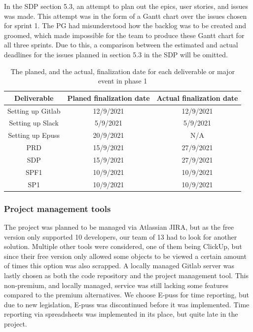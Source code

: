 \documentclass{article}
\begin{document}
In the SDP section 5.3, an attempt to plan out the epics, user stories, and issues was made. This attempt was in the form of a Gantt chart over the issues chosen for sprint 1. The PG had misunderstood how the backlog was to be created and groomed, which made impossible for the team to produce these Gantt chart for all three sprints. Due to this, a comparison between the estimated and actual deadlines for the issues planned in section 5.3 in the SDP will be omitted. 

\begin{table}[h!]
    \centering
    \begin{tabular}{|c|c|c|}
    \hline
    Deliverable & Planed finalization date & Actual finalization date \\ \hline\hline
    Setting up Gitlab & 12/9/2021 & 12/9/2021 \\ \hline
    Setting up Slack & 5/9/2021 & 5/9/2021 \\ \hline
    Setting up Epuss & 20/9/2021 & N/A \\ \hline
    PRD & 15/9/2021 & 27/9/2021 \\ \hline
    SDP & 15/9/2021 & 27/9/2021 \\ \hline
    SPF1 & 10/9/2021 & 10/9/2021 \\ \hline
    SP1 & 10/9/2021 & 10/9/2021 \\ \hline    
    \end{tabular}
    \caption{The planed, and the actual, finalization date for each deliverable or major event in phase 1}
    \label{tab:deadlines1}
\end{table}


\subsubsection{Project management tools}\label{project_tools}

The project was planned to be managed via Atlassian JIRA, but as the free version only supported 10 developers, our team of 13 had to look for another solution. Multiple other tools were considered, one of them being ClickUp, but since their free version only allowed some objects to be viewed a certain amount of times this option was also scrapped. A locally managed Gitlab server was lastly chosen as both the code repository and the project management tool. This non-premium, and locally managed, service was still lacking some features compared to the premium alternatives. We choose E-puss for time reporting, but due to new legislation, E-puss was discontinued before it was implemented. Time reporting via spreadsheets was implemented in its place, but quite late in the project.
\end{document}
